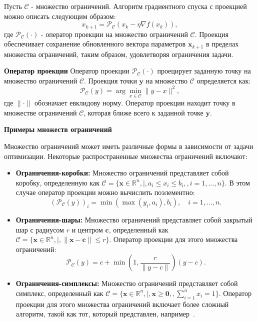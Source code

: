 Пусть $\mathcal{C}$ - множество ограничений.
Алгоритм градиентного спуска с проекцией
можно описать следующим образом:
\[ x_{k+1} = \mathcal{P}_{\mathcal{C}}(x_k - \eta \nabla f(x_k)), \]
где $\mathcal{P}_{\mathcal{C}}(\cdot)$ - оператор проекции
на множество ограничений $\mathcal{C}$.
Проекция обеспечивает сохранение обновленного
вектора параметров $\mathbf{x}_{k+1}$ в пределах множества
ограничений, таким образом, удовлетворяя ограничения задачи.

\textbf{Оператор проекции}
Оператор проекции $\mathcal{P}_{\mathcal{C}}(\cdot)$
проецирует заданную точку на множество ограничений $\mathcal{C}$.
Проекция точки $\mathbf{y}$ на множество $\mathcal{C}$ определяется как:
\[
    \mathcal{P}_{\mathcal{C}}(y) =
    \arg \min_{x \in \mathcal{C}} \|y - x\|^2,
\]
где $\|\cdot\|$ обозначает евклидову норму.
Оператор проекции находит точку в множестве ограничений
$\mathcal{C}$, которая ближе всего к заданной точке $\mathbf{y}$.

\textbf{Примеры множеств ограничений}

Множество ограничений может иметь различные формы
в зависимости от задачи оптимизации.
Некоторые распространенные множества ограничений включают:
\begin{itemize}
    \item \textbf{Ограничения-коробки:} Множество ограничений представляет
    собой коробку, определенную как
    $\mathcal{C} = \{\mathbf{x} \in \mathbb{R}^n , | , a_i
    \leq x_i \leq b_i, , i=1,\dots,n\}$.
    В этом случае оператор проекции можно вычислить поэлементно:
    \[
        (\mathcal{P}_{\mathcal{C}}(y))_i =
        \min(\max(y_i, a_i), b_i), \quad i=1,\dots,n.
    \]

    \item \textbf{Ограничения-шары:} Множество ограничений представляет
    собой закрытый шар с радиусом $r$ и центром $\mathbf{c}$,
    определенный как $\mathcal{C} = \{\mathbf{x} \in \mathbb{R}^n , | ,
    \|\mathbf{x} - \mathbf{c}\| \leq r\}$.
    Оператор проекции для этого множества ограничений:
    \[
        \mathcal{P}_{\mathcal{C}}(y) = c
        + \min\left(1, \frac{r}{\|y-c\|}\right)(y-c).
    \]
    \item \textbf{Ограничения-симплексы:} Множество ограничений
    представляет собой симплекс, определенный как
    $\mathcal{C} = \{\mathbf{x} \in \mathbb{R}^n ,
    | , \mathbf{x} \geq \mathbf{0}, , \sum_{i=1}^n x_i = 1\}$.
    Оператор проекции для этого множества ограничений включает
    более сложный алгоритм, такой как тот,
    который представлен, например~\cite{Duchi2011}.
\end{itemize}

